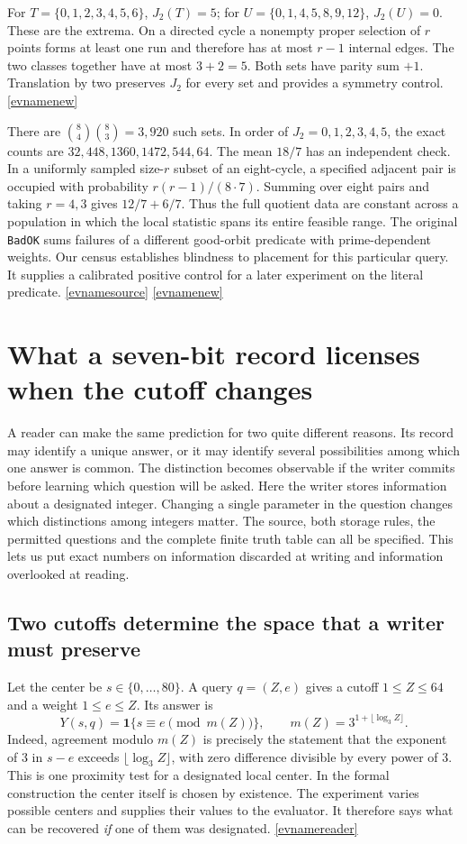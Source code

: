 \documentclass[11pt,letterpaper]{article}
\newcommand{\evref}[1]{\hyperlink{ev-#1}{\textsf{\small[\csname evname#1\endcsname]}}}
\begin{document}
For \(T=\{0,1,2,3,4,5,6\}\), \(J_2(T)=5\); for \(U=\{0,1,4,5,8,9,12\}\), \(J_2(U)=0\). These are the extrema. On a directed cycle a nonempty proper selection of \(r\) points forms at least one run and therefore has at most \(r-1\) internal edges. The two classes together have at most \(3+2=5\). Both sets have parity sum \(+1\). Translation by two preserves \(J_2\) for every set and provides a symmetry control. \evref{new}

There are \(\binom84\binom83=3{,}920\) such sets. In order of \(J_2=0,1,2,3,4,5\), the exact counts are \(32,448,1360,1472,544,64\). The mean \(18/7\) has an independent check. In a uniformly sampled size-\(r\) subset of an eight-cycle, a specified adjacent pair is occupied with probability \(r(r-1)/(8\cdot7)\). Summing over eight pairs and taking \(r=4,3\) gives \(12/7+6/7\). Thus the full quotient data are constant across a population in which the local statistic spans its entire feasible range. The original \texttt{BadOK} sums failures of a different good-orbit predicate with prime-dependent weights. Our census establishes blindness to placement for this particular query. It supplies a calibrated positive control for a later experiment on the literal predicate. \evref{source} \evref{new}

\section{What a seven-bit record licenses when the cutoff changes}
\label{sec:reader-fibers}

A reader can make the same prediction for two quite different reasons. Its record may identify a unique answer, or it may identify several possibilities among which one answer is common. The distinction becomes observable if the writer commits before learning which question will be asked. Here the writer stores information about a designated integer. Changing a single parameter in the question changes which distinctions among integers matter. The source, both storage rules, the permitted questions and the complete finite truth table can all be specified. This lets us put exact numbers on information discarded at writing and information overlooked at reading.

\subsection{Two cutoffs determine the space that a writer must preserve}

Let the center be \(s\in\{0,\ldots,80\}\). A query \(q=(Z,e)\) gives a cutoff \(1\le Z\le64\) and a weight \(1\le e\le Z\). Its answer is
\[
  Y(s,q)=\mathbf{1}\{s\equiv e\pmod{m(Z)}\},
  \qquad m(Z)=3^{1+\lfloor\log_3 Z\rfloor}.
\]
Indeed, agreement modulo \(m(Z)\) is precisely the statement that the exponent of 3 in \(s-e\) exceeds \(\lfloor\log_3 Z\rfloor\), with zero difference divisible by every power of 3. This is one proximity test for a designated local center. In the formal construction the center itself is chosen by existence. The experiment varies possible centers and supplies their values to the evaluator. It therefore says what can be recovered \emph{if} one of them was designated. \evref{reader}
\end{document}
